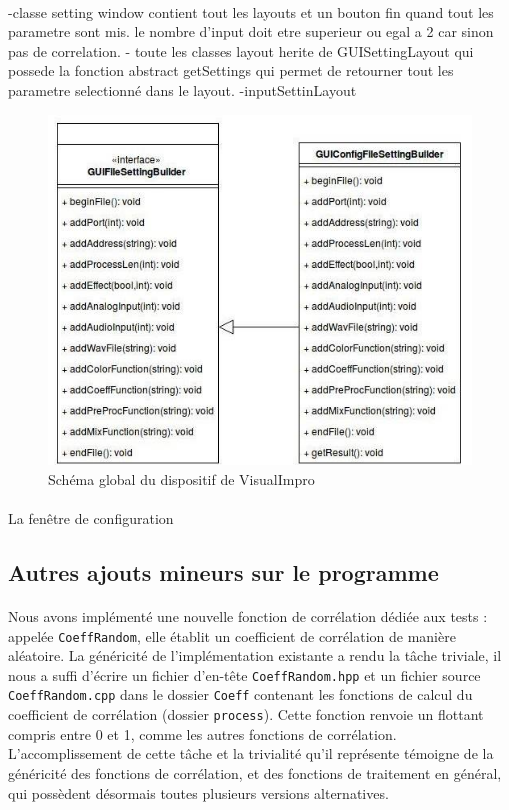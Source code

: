  \paragraph{}
 -classe setting window contient tout les layouts et un bouton fin quand tout les
 parametre sont mis. le nombre d'input doit etre superieur ou egal a 2 car sinon pas de
 correlation.
 - toute les classes layout herite de GUISettingLayout qui possede la fonction
 abstract getSettings qui permet de retourner tout les parametre selectionné dans le layout.
 -inputSettinLayout
 \begin{figure}[h]
  \centering
  \includegraphics[scale=0.5]{assets/umlBuilder.png}
  \caption{Schéma global du dispositif de VisualImpro}
  \label{schéma global}
 \end{figure}

 \paragraph{}
 La fenêtre de configuration%

 \subsection{Autres ajouts mineurs sur le programme}
 \paragraph{}
 Nous avons implémenté une nouvelle fonction de corrélation dédiée aux
 tests : appelée \verb!CoeffRandom!, elle établit un coefficient de
 corrélation de manière aléatoire. La généricité de l'implémentation
 existante a rendu la tâche triviale, il nous a suffi d'écrire un
 fichier d'en-tête \verb!CoeffRandom.hpp! et un fichier source
 \verb!CoeffRandom.cpp! dans le dossier \verb!Coeff! contenant les
 fonctions de calcul du coefficient de corrélation (dossier
 \verb!process!). Cette fonction renvoie un flottant compris entre 0 et
 1, comme les autres fonctions de corrélation. L'accomplissement de
 cette tâche et la trivialité qu'il représente témoigne de la
 généricité des fonctions de corrélation, et des fonctions de
 traitement en général, qui possèdent désormais toutes plusieurs
 versions alternatives.
